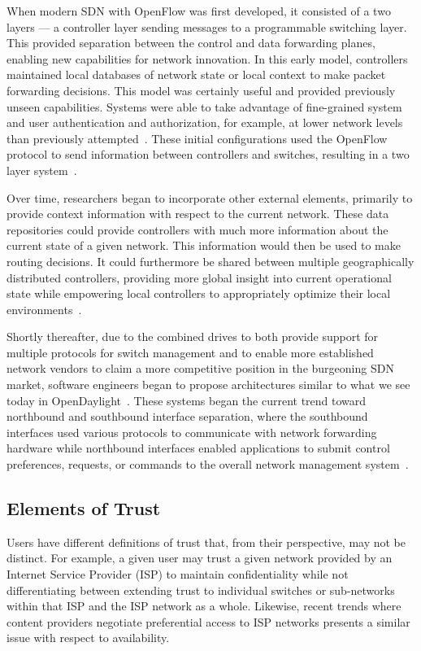 \documentclass[10pt,conference]{IEEEtran}
\begin{document}
When modern SDN with OpenFlow was first developed, it consisted of a two layers --- a controller layer sending messages to a programmable switching layer.  This provided separation between the control and data forwarding planes, enabling new capabilities for network innovation.  In this early model, controllers maintained local databases of network state or local context to make packet forwarding decisions.  This model was certainly useful and provided previously unseen capabilities.  Systems were able to take advantage of fine-grained system and user authentication and authorization, for example, at lower network levels than previously attempted~\cite{CaFrPeLu:07}.  These initial configurations used the OpenFlow protocol to send information between controllers and switches, resulting in a two layer system~\cite{openflow1.0}.

Over time, researchers began to incorporate other external elements, primarily to provide context information with respect to the current network.  These data repositories could provide controllers with much more information about the current state of a given network.  This information would then be used to make routing decisions.  It could furthermore be shared between multiple geographically distributed controllers, providing more global insight into current operational state while empowering local controllers to appropriately optimize their local environments~\cite{HeShMc:12,ScSu:13}.

Shortly thereafter, due to the combined drives to both provide support for multiple protocols for switch management and to enable more established network vendors to claim a more competitive position in the burgeoning SDN market, software engineers began to propose architectures similar to what we see today in OpenDaylight~\cite{opendaylight}.  These systems began the current trend toward northbound and southbound interface separation, where the southbound interfaces used various protocols to communicate with network forwarding hardware while northbound interfaces enabled applications to submit control preferences, requests, or commands to the overall network management system~\cite{opendaylight,big_network_controller}.

\subsection{Elements of Trust}
\label{sec:elements}
Users have different definitions of trust that, from their perspective, may not be distinct.  For example, a given user may trust a given network provided by an Internet Service Provider (ISP) to maintain confidentiality while not differentiating between extending trust to individual switches or sub-networks within that ISP and the ISP network as a whole.  Likewise, recent trends where content providers negotiate preferential access to ISP networks presents a similar issue with respect to availability.
\end{document}
